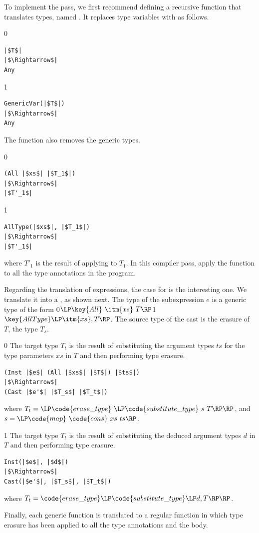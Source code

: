 \documentclass[7x10]{TimesAPriori_MIT}%
\def\racketEd{0}
\def\pythonEd{1}
\providecommand{\BookEdition}{1}
\let\edition\BookEdition
\newcommand{\racket}[1]{{\if\edition\racketEd{#1}\fi}}
\newcommand{\pythonColor}[0]{}
\newcommand{\python}[1]{{\if\edition\pythonEd\pythonColor #1\fi}}
\numberwithin{theorem}{chapter}
\numberwithin{definition}{chapter}
\numberwithin{equation}{chapter}
\begin{document}
To implement the  pass, we first recommend defining
a recursive function that translates types, named
. It replaces type variables with \CANYTY{} as
follows.
%
{\if\edition\racketEd
\begin{lstlisting}
|$T$|
|$\Rightarrow$|
Any
\end{lstlisting}
\fi}
{\if\edition\pythonEd\pythonColor
\begin{lstlisting}
GenericVar(|$T$|)
|$\Rightarrow$|
Any
\end{lstlisting}
\fi}
%
\noindent The  function also removes the generic
 types.
%
{\if\edition\racketEd
\begin{lstlisting}
(All |$xs$| |$T_1$|)
|$\Rightarrow$|
|$T'_1$|
\end{lstlisting}
\fi}
{\if\edition\pythonEd\pythonColor
\begin{lstlisting}
AllType(|$xs$|, |$T_1$|)
|$\Rightarrow$|
|$T'_1$|
\end{lstlisting}
\fi}
\noindent where $T'_1$ is the result of applying  to
$T_1$.
%
In this compiler pass, apply the  function to all 
the type annotations in the program.

Regarding the translation of expressions, the case for  is
the interesting one. We translate it into a , as shown
next.
The type of the subexpression $e$ is a generic type of the form
\racket{$\LP\key{All}~\itm{xs}~T\RP$}\python{$\key{AllType}\LP\itm{xs}, T\RP$}.
The source type of the cast is the erasure of $T$, the type $T_s$.
%
{\if\edition\racketEd
%
The target type $T_t$ is the result of substituting the argument types
$ts$ for the type parameters $xs$ in $T$ and then performing type
erasure.
%
\begin{lstlisting}
(Inst |$e$| (All |$xs$| |$T$|) |$ts$|)
|$\Rightarrow$|
(Cast |$e'$| |$T_s$| |$T_t$|)
\end{lstlisting}
%
where $T_t = \LP\code{erase\_type}~\LP\code{substitute\_type}~s~T\RP\RP$,
and $s = \LP\code{map}~\code{cons}~xs~ts\RP$.
\fi}
{\if\edition\pythonEd\pythonColor
%
The target type $T_t$ is the result of substituting the deduced
argument types $d$ in $T$ and then performing type erasure.
%
\begin{lstlisting}
Inst(|$e$|, |$d$|)
|$\Rightarrow$|
Cast(|$e'$|, |$T_s$|, |$T_t$|)
\end{lstlisting}
%
where
$T_t = \code{erase\_type}\LP\code{substitute\_type}\LP d, T\RP\RP$.
\fi}

Finally, each generic function is translated to a regular
function in which type erasure has been applied to all the type
annotations and the body.
\end{document}
